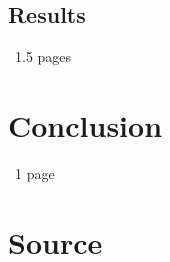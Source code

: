 \documentclass[11pt]{article}
\begin{document}
\subsection{Results}
~1.5 pages

\section{Conclusion}
~1 page


{}



\appendix
\section{Source}

\end{document}
